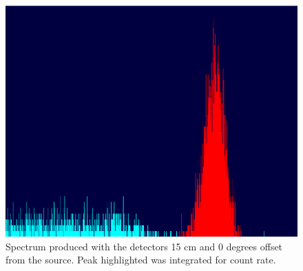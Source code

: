 \documentclass[12pt, letterpaper, twocolumn]{article}
\begin{document}
\begin{figure}[H]
    \centering
    \includegraphics[width=0.9\linewidth]{Figures/sample_spectrum.png}
    \caption{Spectrum produced with the detectors 15 cm and 0 degrees offset
    from the source. Peak highlighted was integrated for count rate.}
    \label{figure:spectrum}
\end{figure}
\end{document}
